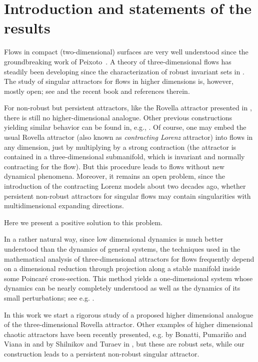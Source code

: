 \documentclass[reqno,12pt,a4paper]{amsart}
\theoremstyle{plain}
\theoremstyle{definition}
\begin{document}
\setcounter{tocdepth}{2}

\tableofcontents

\section{Introduction and statements of the results}
\label{sec:introd-statem-result}

Flows in compact (two-dimensional) surfaces are very well
understood since the groundbreaking work of
Peixoto~\cite{peixoto59,peixoto62}. A theory of
three-dimensional flows has steadily been developing since
the characterization of robust invariant sets in
\cite{MPP04}.  The study of singular attractors for flows in
higher dimensions is, however, mostly open; see
\cite{BPV97,MeMor06} and the recent book \cite{AraPac2010}
and references therein.  

For non-robust but persistent attractors, like the Rovella
attractor presented in \cite{Ro93}, there is still no
higher-dimensional analogue. Other previous constructions
yielding similar behavior can be found in,
e.g., \cite{Smnv78,Smnv78a,LybmvZks,TurShlnk87,GmbdTress88,GmdPrcThmTres}.
Of course, one may embed the usual Rovella attractor (also
known as \emph{contracting Lorenz} attractor) into flows in
any dimension, just by multiplying by a strong
contraction (the attractor is contained in a
three-dimensional submanifold, which is invariant and
normally contracting for the flow).  But this procedure
leads to flows without new dynamical phenomena.  Moreover,
it remains an open problem, since the introduction of the
contracting Lorenz models about two decades ago, whether
persistent non-robust attractors for singular flows may
contain singularities with multidimensional expanding
directions.

Here we present a positive solution to this problem.

In a rather natural way, since low dimensional dynamics is
much better understood than the dynamics of general systems,
the techniques used in the mathematical analysis of
three-dimensional attractors for flows frequently depend on
a dimensional reduction through projection along a stable
manifold inside some Poincar\'e cross-section. This method
yields a one-dimensional system whose dynamics can be nearly
completely understood as well as the dynamics of its small
perturbations; see e.g. \cite{MartdMelo01,MS93}.

In this work we start a rigorous study of a proposed higher
dimensional analogue of the three-dimensional Rovella
attractor. Other examples of higher dimensional chaotic
attractors have been recently presented, e.g. by Bonatti,
Pumari\~no and Viana in \cite{BPV97} and by Shilnikov and
Turaev in \cite{ST98}, but these are robust sets, while our
construction leads to a persistent non-robust singular
attractor.
\end{document}
